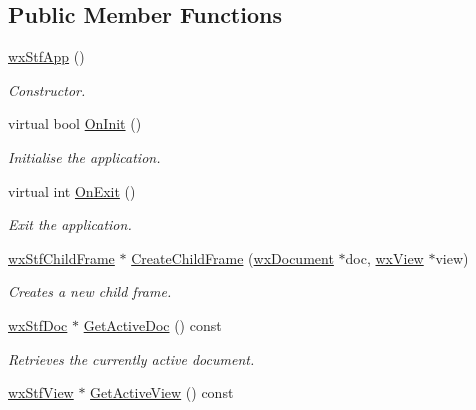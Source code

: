 \subsection*{Public Member Functions}
\begin{DoxyCompactItemize}
\item 
\hypertarget{classwxStfApp_a589012f57e32c0c45fda2db4f88d93bb}{
\hyperlink{classwxStfApp_a589012f57e32c0c45fda2db4f88d93bb}{wxStfApp} ()}
\label{classwxStfApp_a589012f57e32c0c45fda2db4f88d93bb}

\begin{DoxyCompactList}\small\item\em Constructor. \item\end{DoxyCompactList}\item 
virtual bool \hyperlink{classwxStfApp_a2933498655e65fab015ccc643f97e096}{OnInit} ()
\begin{DoxyCompactList}\small\item\em Initialise the application. \item\end{DoxyCompactList}\item 
virtual int \hyperlink{classwxStfApp_ad0777eb76fe6a4b73ac95e41eefe7768}{OnExit} ()
\begin{DoxyCompactList}\small\item\em Exit the application. \item\end{DoxyCompactList}\item 
\hyperlink{classwxStfChildFrame}{wxStfChildFrame} $\ast$ \hyperlink{classwxStfApp_a3e1a978b7ade905d5ee2465305273b88}{CreateChildFrame} (\hyperlink{classwxDocument}{wxDocument} $\ast$doc, \hyperlink{classwxView}{wxView} $\ast$view)
\begin{DoxyCompactList}\small\item\em Creates a new child frame. \item\end{DoxyCompactList}\item 
\hyperlink{classwxStfDoc}{wxStfDoc} $\ast$ \hyperlink{classwxStfApp_a1300dc5dad0790f58726e11088441b18}{GetActiveDoc} () const 
\begin{DoxyCompactList}\small\item\em Retrieves the currently active document. \item\end{DoxyCompactList}\item 
\hyperlink{classwxStfView}{wxStfView} $\ast$ \hyperlink{classwxStfApp_a62a9c9d666190a4389224686b6dd7faa}{GetActiveView} () const 

\end{DoxyCompactItemize}
